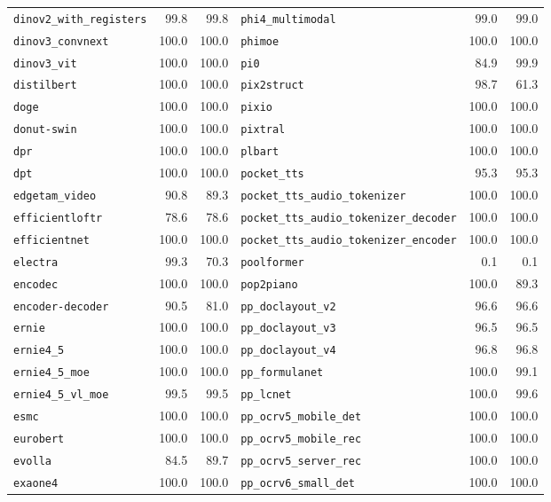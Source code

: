 \begin{longtable}{@{}lrr@{\hspace{24pt}}lrr@{}}
\texttt{dinov2\_with\_registers} & 99.8 & 99.8 & \texttt{phi4\_multimodal} & 99.0 & 99.0 \\
\texttt{dinov3\_convnext} & 100.0 & 100.0 & \texttt{phimoe} & 100.0 & 100.0 \\
\texttt{dinov3\_vit} & 100.0 & 100.0 & \texttt{pi0} & 84.9 & 99.9 \\
\texttt{distilbert} & 100.0 & 100.0 & \texttt{pix2struct} & 98.7 & 61.3 \\
\texttt{doge} & 100.0 & 100.0 & \texttt{pixio} & 100.0 & 100.0 \\
\texttt{donut-swin} & 100.0 & 100.0 & \texttt{pixtral} & 100.0 & 100.0 \\
\texttt{dpr} & 100.0 & 100.0 & \texttt{plbart} & 100.0 & 100.0 \\
\texttt{dpt} & 100.0 & 100.0 & \texttt{pocket\_tts} & 95.3 & 95.3 \\
\texttt{edgetam\_video} & 90.8 & 89.3 & \texttt{pocket\_tts\_audio\_tokenizer} & 100.0 & 100.0 \\
\texttt{efficientloftr} & 78.6 & 78.6 & \texttt{pocket\_tts\_audio\_tokenizer\_decoder} & 100.0 & 100.0 \\
\texttt{efficientnet} & 100.0 & 100.0 & \texttt{pocket\_tts\_audio\_tokenizer\_encoder} & 100.0 & 100.0 \\
\texttt{electra} & 99.3 & 70.3 & \texttt{poolformer} & 0.1 & 0.1 \\
\texttt{encodec} & 100.0 & 100.0 & \texttt{pop2piano} & 100.0 & 89.3 \\
\texttt{encoder-decoder} & 90.5 & 81.0 & \texttt{pp\_doclayout\_v2} & 96.6 & 96.6 \\
\texttt{ernie} & 100.0 & 100.0 & \texttt{pp\_doclayout\_v3} & 96.5 & 96.5 \\
\texttt{ernie4\_5} & 100.0 & 100.0 & \texttt{pp\_doclayout\_v4} & 96.8 & 96.8 \\
\texttt{ernie4\_5\_moe} & 100.0 & 100.0 & \texttt{pp\_formulanet} & 100.0 & 99.1 \\
\texttt{ernie4\_5\_vl\_moe} & 99.5 & 99.5 & \texttt{pp\_lcnet} & 100.0 & 99.6 \\
\texttt{esmc} & 100.0 & 100.0 & \texttt{pp\_ocrv5\_mobile\_det} & 100.0 & 100.0 \\
\texttt{eurobert} & 100.0 & 100.0 & \texttt{pp\_ocrv5\_mobile\_rec} & 100.0 & 100.0 \\
\texttt{evolla} & 84.5 & 89.7 & \texttt{pp\_ocrv5\_server\_rec} & 100.0 & 100.0 \\
\texttt{exaone4} & 100.0 & 100.0 & \texttt{pp\_ocrv6\_small\_det} & 100.0 & 100.0 \\

\end{longtable}
